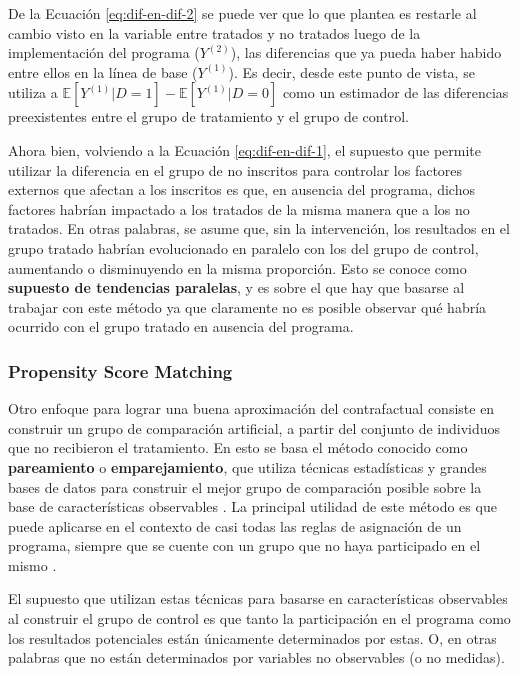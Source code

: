 \documentclass[../../main.tex]{subfiles}
\begin{document}
De la Ecuación \ref{eq:dif-en-dif-2} se puede ver que lo que plantea es restarle al cambio
visto en la variable entre tratados y no tratados luego de la implementación del programa
(\(Y^{(2)}\)), las diferencias que ya pueda haber habido entre ellos en la línea de base
(\(Y^{(1)}\)). Es decir, desde este punto de vista, se utiliza a
\(\mathbb{E}\left[Y^{(1)}|D=1\right] - \mathbb{E}\left[Y^{(1)}|D=0\right]\) como un
estimador de las diferencias preexistentes entre el grupo de tratamiento y el grupo de
control.

Ahora bien, volviendo a la Ecuación \ref{eq:dif-en-dif-1}, el supuesto que permite
utilizar la diferencia en el grupo de no inscritos para controlar los factores externos
que afectan a los inscritos es que, en ausencia del programa, dichos factores habrían
impactado a los tratados de la misma manera que a los no tratados. En otras palabras, se
asume que, sin la intervención, los resultados en el grupo tratado habrían evolucionado en
paralelo con los del grupo de control, aumentando o disminuyendo en la misma proporción.
Esto se conoce como \textbf{supuesto de tendencias paralelas}, y es sobre el que hay que
basarse al trabajar con este método ya que claramente no es posible observar qué habría
ocurrido con el grupo tratado en ausencia del programa.

\subsubsection{Propensity Score Matching}
Otro enfoque para lograr una buena aproximación del contrafactual consiste en construir un
grupo de comparación artificial, a partir del conjunto de individuos que no recibieron el
tratamiento. En esto se basa el método conocido como \textbf{pareamiento} o
\textbf{emparejamiento}, que utiliza técnicas estadísticas y grandes bases de datos para
construir el mejor grupo de comparación posible sobre la base de características
observables \cite{gertler-2016}. La principal utilidad de este método es que puede
aplicarse en el contexto de casi todas las reglas de asignación de un programa, siempre
que se cuente con un grupo que no haya participado en el mismo \cite{gertler-2016}.

El supuesto que utilizan estas técnicas para basarse en características observables al
construir el grupo de control es que tanto la participación en el programa como los
resultados potenciales están únicamente determinados por estas. O, en otras palabras que
no están determinados por variables no observables (o no medidas).
\end{document}
